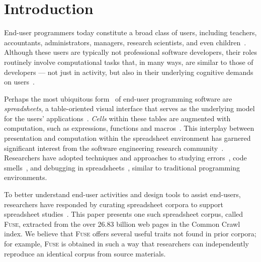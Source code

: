\documentclass[conference]{IEEEtran}
\begin{document}

\section{Introduction}

End-user programmers today constitute a broad class of users, including teachers, accountants, administrators, managers, research scientists, and even children~\cite{Ko2011}.
%
Although these users are typically not professional software developers, their roles routinely involve computational tasks that, in many ways, are similar to those of developers --- not just in activity, but also in their underlying cognitive demands on users~\cite{Blackwell2002}. 

Perhaps the most ubiquitous form~\cite{Scaffidi2005} of end-user programming software are \emph{spreadsheets}, a table-oriented visual interface that serves as the underlying model for the users' applications~\cite{Nardi1990}. \emph{Cells} within these tables are augmented with computation, such as expressions, functions and macros~\cite{Nardi1990}. 
This interplay between presentation and computation within the spreadsheet environment has garnered significant interest from the software engineering research community~\cite{Burnett2009}. 
Researchers have adopted techniques and approaches to studying errors~\cite{Pinzger2012}, code smells~\cite{Badame2012}, and debugging in spreadsheets~\cite{Powell2008}, similar to traditional programming environments. 


To better understand end-user activities and design tools to assist end-users, researchers have responded by curating spreadsheet corpora to support spreadsheet studies~\cite{Fisher2005,Hermans2015,Chen2013}. This paper presents one such spreadsheet corpus, called \textsc{Fuse}, extracted from the over 26.83 billion web pages in the Common Crawl index. We believe that \textsc{Fuse} offers several useful traits not found in prior corpora; 
for example, \textsc{Fuse} is obtained in such a way that researchers can independently reproduce an identical corpus from source materials.
\end{document}
